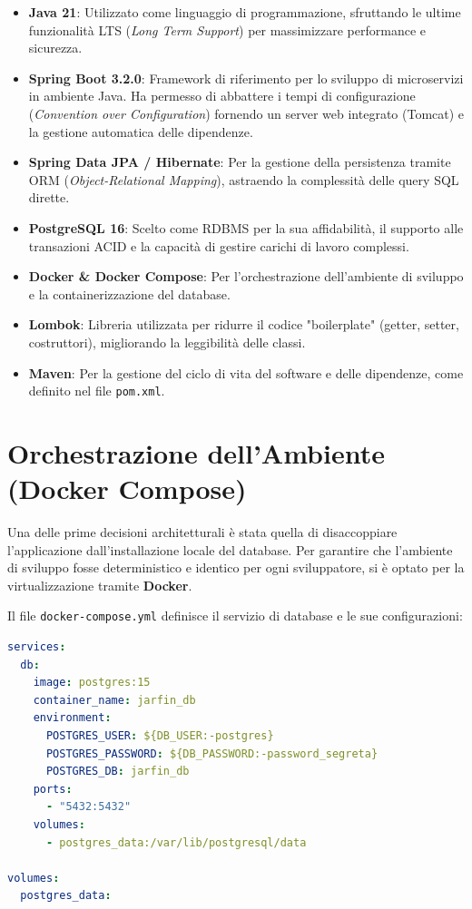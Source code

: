 \begin{itemize}
    \item \textbf{Java 21}: Utilizzato come linguaggio di programmazione, sfruttando le ultime funzionalità LTS (\textit{Long Term Support}) per massimizzare performance e sicurezza.
    \item \textbf{Spring Boot 3.2.0}: Framework di riferimento per lo sviluppo di microservizi in ambiente Java. Ha permesso di abbattere i tempi di configurazione (\textit{Convention over Configuration}) fornendo un server web integrato (Tomcat) e la gestione automatica delle dipendenze.
    \item \textbf{Spring Data JPA / Hibernate}: Per la gestione della persistenza tramite ORM (\textit{Object-Relational Mapping}), astraendo la complessità delle query SQL dirette.
    \item \textbf{PostgreSQL 16}: Scelto come RDBMS per la sua affidabilità, il supporto alle transazioni ACID e la capacità di gestire carichi di lavoro complessi.
    \item \textbf{Docker \& Docker Compose}: Per l'orchestrazione dell'ambiente di sviluppo e la containerizzazione del database.
    \item \textbf{Lombok}: Libreria utilizzata per ridurre il codice "boilerplate" (getter, setter, costruttori), migliorando la leggibilità delle classi.
    \item \textbf{Maven}: Per la gestione del ciclo di vita del software e delle dipendenze, come definito nel file \texttt{pom.xml}.
\end{itemize}

\section{Orchestrazione dell'Ambiente (Docker Compose)}

Una delle prime decisioni architetturali è stata quella di disaccoppiare l'applicazione dall'installazione locale del database. Per garantire che l'ambiente di sviluppo fosse deterministico e identico per ogni sviluppatore, si è optato per la virtualizzazione tramite \textbf{Docker}.

Il file \texttt{docker-compose.yml} definisce il servizio di database e le sue configurazioni:

\bigskip

\begin{lstlisting}[language=yaml, label={lst:dockercompose}]
services:
  db:
    image: postgres:15
    container_name: jarfin_db
    environment:
      POSTGRES_USER: ${DB_USER:-postgres}
      POSTGRES_PASSWORD: ${DB_PASSWORD:-password_segreta}
      POSTGRES_DB: jarfin_db
    ports:
      - "5432:5432"
    volumes:
      - postgres_data:/var/lib/postgresql/data

volumes:
  postgres_data:
\end{lstlisting}

